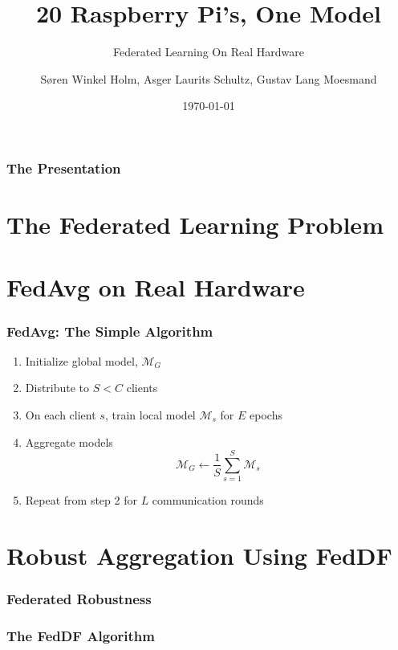 \documentclass{beamer}
\title{20 Raspberry Pi's, One Model}
\subtitle{
    Federated Learning On Real Hardware
}
\author[Søren Holm, Asger Schultz, Gustav Moesmand]
{Søren Winkel Holm, Asger Laurits Schultz, Gustav Lang Moesmand}
\institute[DTU]{Technical University of Denmark}
\date{\today}
\begin{document}
\begin{frame}
    \titlepage
\end{frame}

\begin{frame}
    \frametitle{The Presentation}
    \footnotesize
    \tableofcontents
\end{frame}

\section{The Federated Learning Problem}
\begin{frame}
\end{frame}

\section{FedAvg on Real Hardware}
\begin{frame}
    \frametitle{FedAvg: The Simple Algorithm}
    \begin{enumerate}
        \item Initialize global model, $\mathcal M_G$
        \item Distribute to $S<C$ clients
        \item On each client $s$, train local model $\mathcal M_s$ for $E$ epochs
        \item Aggregate models
    \begin{equation*}
        \mathcal M_G \gets \frac{1}{S} \sum_{s=1}^{S} \mathcal M_s
    \end{equation*}
        \item Repeat from step 2 for $L$ communication rounds
    \end{enumerate}
\end{frame}

\section{Robust Aggregation Using FedDF}
\begin{frame}
    \frametitle{Federated Robustness}
\end{frame}

\begin{frame}
    \frametitle{The FedDF Algorithm}
\end{frame}
\end{document}
